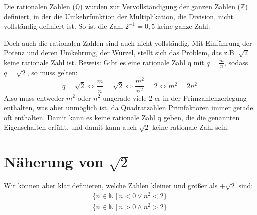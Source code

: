 \documentclass[12pt]{article}
\begin{document}
    Die rationalen Zahlen (\begin{math}\mathbb{Q}\end{math}) wurden zur Vervollständigung der ganzen Zahlen
    (\begin{math}\mathbb{Z}\end{math}) definiert, in der die
    Umkehrfunktion der Multiplikation, die Division, nicht vollständig definiert ist.
    So ist die Zahl $2^{-1} = 0,5$ keine ganze Zahl.

    Doch auch die rationalen Zahlen sind auch nicht vollständig.
    Mit Einführung der Potenz und deren Umkehrung, der Wurzel, stellt sich das Problem, das z.B.
    $\sqrt{2}$ keine rationale Zahl ist.
    Beweis:
    Gibt es eine rationale Zahl q mit $q=\frac{m}{n}$, sodass $q=\sqrt{2}$, so muss gelten:
    \begin{equation}
        q = \sqrt{2} \Leftrightarrow \frac{m}{n} = \sqrt{2} \Leftrightarrow \frac{m^2}{n^2} = 2 \Leftrightarrow m^2 = 2n^2
    \end{equation}
    Also muss entweder \begin{math}m^2\end{math} oder \begin{math}n^2\end{math} ungerade viele 2-er in der
    Primzahlenzerlegung enthalten, was aber unmöglich ist, da Quadratzahlen Primfaktoren immer gerade oft enthalten.
    Damit kann es keine rationale Zahl q geben, die die genannten Eigenschaften erfüllt, und damit kann auch
    \begin{math}\sqrt{2}\end{math} keine rationale Zahl sein.


    \section{Näherung von \begin{math}\sqrt{2}\end{math}}

    Wir können aber klar definieren, welche Zahlen kleiner und größer als \begin{math}+\sqrt{2}\end{math} sind:
    \begin{displaymath}\begin{split}
        \{n \in \mathbb{N} \mspace{4mu} | \mspace{4mu} n < 0 \lor n^2 < 2\} \\
        \{n \in \mathbb{N} \mspace{4mu} | \mspace{4mu} n > 0 \land n^2 > 2\}
    \end{split}\end{displaymath}
\end{document}
